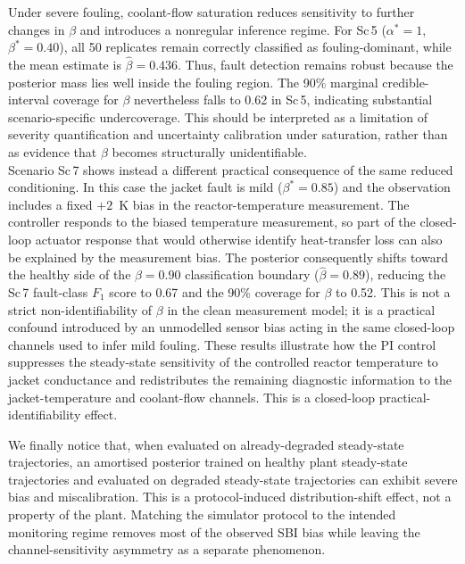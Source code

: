 \documentclass[aps,pre,twocolumn,superscriptaddress,floatfix]{revtex4-2}
\begin{document}
Under severe fouling, coolant-flow saturation reduces sensitivity to further changes in 
$\beta$ and introduces a nonregular inference regime. For Sc\,5 ($\alpha^*=1$, $\beta^*=0.40$),
all 50 replicates remain correctly classified as fouling-dominant, while the mean estimate 
is $\hat{\beta}=0.436$. Thus, fault detection remains robust
because the posterior mass lies well inside the fouling region. The 90\% marginal credible-interval 
coverage for $\beta$ nevertheless falls to 0.62 in Sc\,5, indicating substantial scenario-specific 
undercoverage. This should be interpreted as a limitation of severity quantification and 
uncertainty calibration under saturation, 
rather than as evidence that $\beta$ becomes structurally unidentifiable.\\
Scenario Sc\,7 shows instead a different practical consequence of the same reduced conditioning. In this case
the jacket fault is mild ($\beta^*=0.85$) and the observation includes a fixed $+2$~K bias in the reactor-temperature measurement. The controller responds to the biased temperature measurement, so part of the closed-loop
actuator response that would otherwise identify heat-transfer loss can also be explained by the
measurement bias. The posterior consequently shifts toward the healthy side of the
$\beta=0.90$ classification boundary ($\hat{\beta}=0.89$), reducing the Sc\,7 fault-class
$F_1$ score to 0.67 and the 90\% coverage for $\beta$ to 0.52. This is not a strict
non-identifiability of $\beta$ in the clean measurement model; it is a practical confound introduced
by an unmodelled sensor bias acting in the same closed-loop channels used to infer mild fouling.
These results illustrate how the 
PI control suppresses the steady-state sensitivity of the controlled reactor 
temperature to jacket conductance and redistributes the remaining diagnostic information to
the jacket-temperature and coolant-flow channels. This is a closed-loop 
practical-identifiability effect.

We finally notice that, when evaluated on already-degraded steady-state trajectories, 
an amortised posterior trained on healthy plant steady-state trajectories and 
evaluated on degraded steady-state trajectories can exhibit severe bias and 
miscalibration. This is a protocol-induced distribution-shift effect, not a property of the plant. 
Matching the simulator protocol to the intended monitoring regime removes most of the observed SBI
bias while leaving the channel-sensitivity asymmetry as a separate phenomenon.
\end{document}
